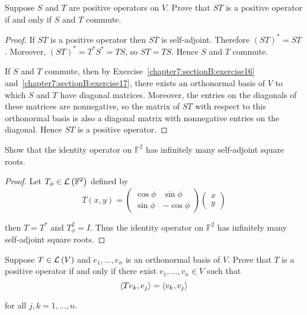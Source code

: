 \begin{exercise}
    Suppose $S$ and $T$ are positive operators on $V$. Prove that $ST$ is a positive operator if and only if $S$ and $T$ commute.
\end{exercise}

\begin{proof}
    If $ST$ is a positive operator then $ST$ is self-adjoint. Therefore ${(ST)}^{*} = ST$. Moreover, ${(ST)}^{*} = T^{*}S^{*} = TS$, so $ST = TS$. Hence $S$ and $T$ commute.

    If $S$ and $T$ commute, then by Exercise~\ref{chapter7:sectionB:exercise16} and~\ref{chapter7:sectionB:exercise17}, there exists an orthonormal basis of $V$ to which $S$ and $T$ have diagonal matrices. Moreover, the entries on the diagonals of these matrices are nonnegative, so the matrix of $ST$ with respect to this orthonormal basis is also a diagonal matrix with nonnegative entries on the diagonal. Hence $ST$ is a positive operator.
\end{proof}
\newpage

\begin{exercise}
    Show that the identity operator on $\mathbb{F}^{2}$ has infinitely many self-adjoint square roots.
\end{exercise}

\begin{proof}
    Let $T_{\phi}\in\mathcal{L}\left({\mathbb{F}^{2}}\right)$ defined by
    \[
        T(x, y) = \begin{pmatrix}
            \cos\phi & \sin\phi  \\
            \sin\phi & -\cos\phi
        \end{pmatrix}
        \begin{pmatrix}
            x \\
            y
        \end{pmatrix}
    \]

    then $T = T^{*}$ and $T_{\phi}^{2} = I$. Thus the identity operator on $\mathbb{F}^{2}$ has infinitely many self-adjoint square roots.
\end{proof}
\newpage

\begin{exercise}\label{chapter7:sectionC:exercise20}
    Suppose $T \in \mathcal{L}\left({V}\right)$ and $e_{1}, \ldots, e_{n}$ is an orthonormal basis of $V$. Prove that $T$ is a positive operator if and only if there exist $v_{1}, \ldots, v_{n} \in V$ such that
    \[
        \left\langle{Te_{k}, e_{j}}\right\rangle = \left\langle{v_{k}, v_{j}}\right\rangle
    \]

    for all $j, k = 1,\ldots, n$.
\end{exercise}

